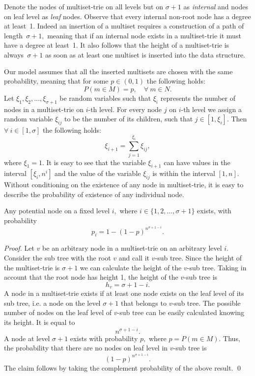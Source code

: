 Denote the nodes of multiset-trie on all levels but on $\sigma + 1$ as \emph{internal}
and nodes on leaf level as \emph{leaf} nodes.
%
Observe that every internal non-root node has a degree at least~1. Indeed an
insertion of a multiset requires a construction of a path of length~$\sigma + 1,$
meaning that if an internal node exists in a multiset-trie it must have a degree
at least~1. It also follows that the height of a multiset-trie is always~$\sigma +1$
as soon as at least one multiset is inserted into the data structure.

Our model assumes that all the inserted multisets are chosen with the same probability,
meaning that for some $p\in (0,1)$ the following holds:
\[
P(m\in M) = p, \quad \forall~m\in N.
\]
%
Let $\xi_1, \xi_2, \ldots, \xi_{\sigma+1}$ be random variables such that $\xi_i$
represents the number of nodes in a multiset-trie on $i$-th level. For every node $j$ 
on $i$-th level we assign a random variable $\xi_{ij}$ to be the number of its children, 
such that $j\in[1,\xi_i].$ Then $\forall~i\in[1,\sigma]$ the following holds:
%
\begin{equation}\label{eq:sum_recursive}
\xi_{i+1} = \sum_{j=1}^{\xi_i} \xi_{ij},
\end{equation}
%
where $\xi_1 = 1.$
%
It is easy to see that the variable $\xi_{i+1}$ can have values in the interval
$[\xi_i,n^{i}]$ and the value of the variable $\xi_{ij}$ is within the interval $[1,n].$
Without conditioning on the existence of any node in multiset-trie, 
it is easy to describe the probability of existence of any individual node.

\begin{lemma}\label{l:prob-node-existence}
Any potential node on a fixed level $i,$ where $i\in \{ 1,2,\ldots, \sigma +1 \}$ exists, %
with probability
\begin{equation}
p_i=1-(1-p)^{n^{\sigma + 1 -i}}.
\end{equation}
\end{lemma}
\begin{proof}
Let $v$ be an arbitrary node in a multiset-trie on an arbitrary level $i.$ Consider
the sub tree with the root $v$ and call it $v$-sub tree. Since the height of the
multiset-trie is $\sigma + 1$ we can calculate the height of the $v$-sub tree.
Taking in account that the root node has height 1, the height of the $v$-sub tree is
%
\[
h_v = \sigma + 1 - i.
\]
%
A node in a multiset-trie exists if at least one node exists on the leaf level of its
sub tree, i.e. a node on the level $\sigma + 1$ that belongs to $v$-sub tree. The possible
number of nodes on the leaf level of $v$-sub tree can be easily calculated knowing its height.
It is equal to
%
\[
n^{\sigma + 1 - i}.
\]
%
A node at level $\sigma+1$ exists with probability $p,$ where $p = P(m\in M).$
Thus, the probability that there are no nodes on leaf level in $v$-sub tree is
%
\[
(1-p)^{n^{\sigma +1 - i}}.
\]
%
The claim follows by taking the complement probability of the above result. 
\hspace*{\fill}\qed
%
\end{proof}

